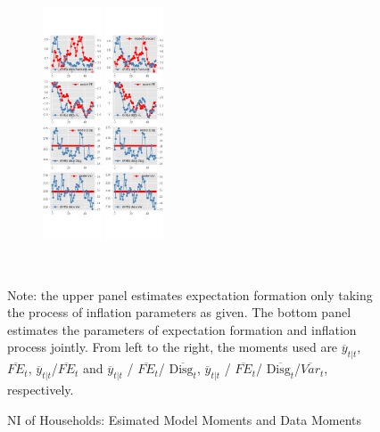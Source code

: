 \documentclass[]{article}
\begin{document}
\begin{figure}[htbp]
\begin{subfigure}[b]{\textwidth}
		\includegraphics[width=0.19\textwidth]{figures/sce_ni_est_joint_diag3.png}
		\includegraphics[width=0.19\textwidth]{figures/sce_ni_est_joint_diag4.png}
	\end{subfigure}
	\\
	\begin{flushleft}
		{\footnotesize Note: the upper panel estimates expectation formation only taking the process of inflation parameters as given. The bottom panel estimates the parameters of expectation formation and inflation process jointly. From left to the right, the moments used are $\overline y_{t|t}$, $\overline{FE}_{t}$, $\overline y_{t|t}$/$\overline{FE}_{t}$ and $\overline y_{t|t}$ / $\overline{FE}_{t}$/ $\overline{\textrm{Disg}_t}$, $\overline y_{t|t}$ / $\overline{FE}_{t}$/ $\overline{\textrm{Disg}_t}$/$\overline{Var}_t$,  respectively.  }
	\end{flushleft}
	\caption{NI of Households: Esimated Model Moments and Data Moments}
\end{figure}
\end{document}
